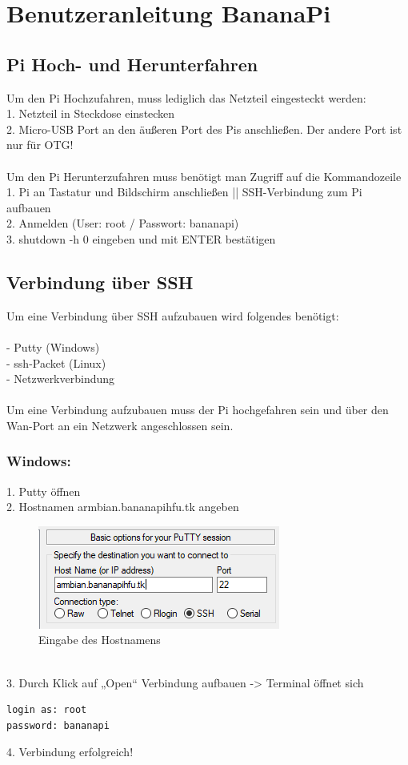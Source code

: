 \chapter{Benutzeranleitung BananaPi}

\section{Pi Hoch- und Herunterfahren}
Um den Pi Hochzufahren, muss lediglich das Netzteil eingesteckt werden:\\
1. Netzteil in Steckdose einstecken\\
2. Micro-USB Port an den äußeren Port des Pis anschließen. Der andere Port ist nur für OTG!\\
~\\
Um den Pi Herunterzufahren muss benötigt man Zugriff auf die Kommandozeile\\
1. Pi an Tastatur und Bildschirm anschließen || SSH-Verbindung zum Pi aufbauen\\
2. Anmelden (User: root / Passwort: bananapi)\\
3. shutdown -h 0 eingeben und mit ENTER bestätigen\\

\section{Verbindung über SSH}
Um eine Verbindung über SSH aufzubauen wird folgendes benötigt:\\
~\\
- Putty (Windows)\\
- ssh-Packet (Linux)\\
- Netzwerkverbindung\\
~\\
Um eine Verbindung aufzubauen muss der Pi hochgefahren sein und über den Wan-Port an ein Netzwerk angeschlossen sein.
\newpage
\subsection*{Windows:}
1. Putty öffnen\\
2. Hostnamen armbian.bananapihfu.tk angeben
\begin{figure}[ht]
\centering
\includegraphics[width=.7\textwidth]{pictures/Jonas/Anleitung/BILD1}
\caption{Eingabe des Hostnamens}
\end{figure}
~\\3. Durch Klick auf „Open“ Verbindung aufbauen -> Terminal öffnet sich
\begin{lstlisting}
login as: root
password: bananapi
\end{lstlisting}
4. Verbindung erfolgreich!

